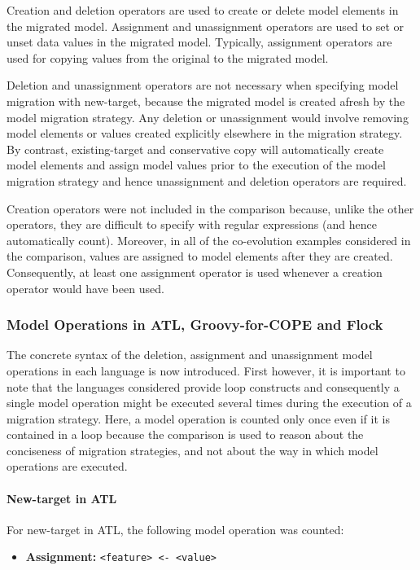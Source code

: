 Creation and deletion operators are used to create or delete model elements in the migrated model. Assignment and unassignment operators are used to set or unset data values in the migrated model. Typically, assignment operators are used for copying values from the original to the migrated model. 

Deletion and unassignment operators are not necessary when specifying model migration with new-target, because the migrated model is created afresh by the model migration strategy. Any deletion or unassignment would involve removing model elements or values created explicitly elsewhere in the migration strategy. By contrast, existing-target and conservative copy will automatically create model elements and assign model values prior to the execution of the model migration strategy and hence unassignment and deletion operators are required.

Creation operators were not included in the comparison because, unlike the other operators, they are difficult to specify with regular expressions (and hence automatically count). Moreover, in all of the co-evolution examples considered in the comparison, values are assigned to model elements after they are created. Consequently, at least one assignment operator is used whenever a creation operator would have been used.

\subsubsection{Model Operations in ATL, Groovy-for-COPE and Flock}
\label{subsubsec:quantitive_model_operations_concrete}
The concrete syntax of the deletion, assignment and unassignment model operations in each language is now introduced. First however, it is important to note that the languages considered provide loop constructs and consequently a single model operation might be executed several times during the execution of a migration strategy. Here, a model operation is counted only once even if it is contained in a loop because the comparison is used to reason about the conciseness of migration strategies, and not about the way in which model operations are executed.

\paragraph{New-target in ATL}
For new-target in ATL, the following model operation was counted:
	
\begin{itemize}
	\item \textbf{Assignment:}
	\subitem \texttt{<feature> <- <value>} 
\end{itemize}

